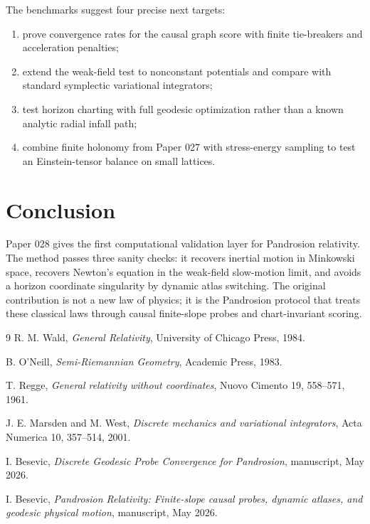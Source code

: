 \documentclass[11pt]{article}
\begin{document}
The benchmarks suggest four precise next targets:
\begin{enumerate}[label=(\roman*)]
\item prove convergence rates for the causal graph score with finite
tie-breakers and acceleration penalties;
\item extend the weak-field test to nonconstant potentials and compare with
standard symplectic variational integrators;
\item test horizon charting with full geodesic optimization rather than a
known analytic radial infall path;
\item combine finite holonomy from Paper 027 with stress-energy sampling to
test an Einstein-tensor balance on small lattices.
\end{enumerate}

\section{Conclusion}

Paper 028 gives the first computational validation layer for Pandrosion
relativity.  The method passes three sanity checks: it recovers inertial
motion in Minkowski space, recovers Newton's equation in the weak-field
slow-motion limit, and avoids a horizon coordinate singularity by dynamic
atlas switching.  The original contribution is not a new law of physics; it is
the Pandrosion protocol that treats these classical laws through causal
finite-slope probes and chart-invariant scoring.

\begin{thebibliography}{9}
R. M. Wald, \emph{General Relativity}, University of Chicago Press, 1984.

B. O'Neill, \emph{Semi-Riemannian Geometry}, Academic Press, 1983.

T. Regge, \emph{General relativity without coordinates}, Nuovo Cimento 19,
558--571, 1961.

J. E. Marsden and M. West, \emph{Discrete mechanics and variational
integrators}, Acta Numerica 10, 357--514, 2001.

I. Besevic, \emph{Discrete Geodesic Probe Convergence for Pandrosion},
manuscript, May 2026.

I. Besevic, \emph{Pandrosion Relativity: Finite-slope causal probes, dynamic
atlases, and geodesic physical motion}, manuscript, May 2026.
\end{thebibliography}
\end{document}
